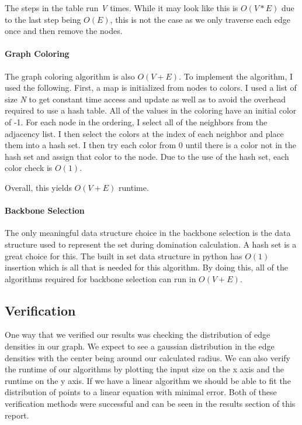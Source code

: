 \documentclass{article}
\begin{document}
    The steps in the table run \textit{V} times.
    While it may look like this is $O(V*E)$ due to the last step being $O(E)$, this is not the case as we only traverse each edge once and then remove the nodes.

    \paragraph{Graph Coloring}
    The graph coloring algorithm is also $O(V+E)$.
    To implement the algorithm, I used the following.
    First, a map is initialized from nodes to colors.
    I used a list of size \textit{N} to get constant time access and update as well as to avoid the overhead required to use a hash table.
    All of the values in the coloring have an initial color of -1.
    For each node in the ordering, I select all of the neighbors from the adjacency list.
    I then select the colors at the index of each neighbor and place them into a hash set.
    I then try each color from 0 until there is a color not in the hash set and assign that color to the node.
    Due to the use of the hash set, each color check is $O(1)$.

    Overall, this yields $O(V+E)$ runtime.

    \paragraph{Backbone Selection}
    The only meaningful data structure choice in the backbone selection is the data structure used to represent the set during domination calculation.
    A hash set is a great choice for this.
    The built in set data structure in python has $O(1)$ insertion which is all that is needed for this algorithm.
    By doing this, all of the algorithms required for backbone selection can run in $O(V+E)$.

	\subsection{Verification}
		One way that we verified our results was checking the distribution of edge densities in our graph.
		We expect to see a gaussian distribution in the edge densities with the center being around our calculated radius.
		We can also verify the runtime of our algorithms by plotting the input size on the x axis and the runtime on the y axis.
		If we have a linear algorithm we should be able to fit the distribution of points to a linear equation with minimal error.
		Both of these verification methods were successful and can be seen in the results section of this report.
\end{document}
